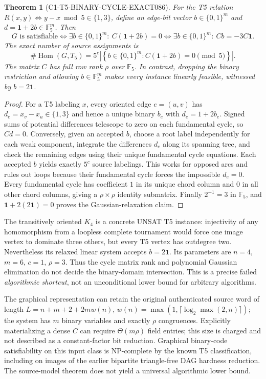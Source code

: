 \documentclass[11pt]{article}
\newtheorem{theorem}{Theorem}
\begin{document}
\begin{theorem}[C1-T5-BINARY-CYCLE-EXACT086]
For the T5 relation $R(x,y)\iff y-x\bmod5\in\{1,3\}$,
define an edge-bit vector $b\in\{0,1\}^m$ and
$d=\mathbf1+2b\in\mathbb F_5^m$. Then
\[
G\text{ is satisfiable}\iff
\exists b\in\{0,1\}^m:\ C(\mathbf1+2b)=0
\iff \exists b\in\{0,1\}^m:\ Cb=-3C\mathbf1.
\]
The exact number of source assignments is
\[
 \#\operatorname{Hom}(G,T_5)
 =
 5^c\left|\left\{b\in\{0,1\}^m:
 C(\mathbf1+2b)=0\pmod5\right\}\right|.
\]
The matrix $C$ has full row rank $\rho$ over $\mathbb F_5$.
In contrast, dropping the binary restriction and allowing
$b\in\mathbb F_5^m$ makes \emph{every instance}
linearly feasible, witnessed by $b=2\mathbf1$.
\end{theorem}
\begin{proof}
For a T5 labeling $x$, every oriented edge $e=(u,v)$ has
$d_e=x_v-x_u\in\{1,3\}$ and hence a unique binary
$b_e$ with $d_e=1+2b_e$. Signed sums of potential differences
telescope to zero on each fundamental cycle, so $Cd=0$.
Conversely, given an accepted $b$, choose a root label independently
for each weak component, integrate the differences $d_e$ along
its spanning tree, and check the remaining edges using their unique
fundamental cycle equations. Each accepted $b$ yields exactly $5^c$
source labelings. This works for opposed arcs and rules out loops
because their fundamental cycle forces the impossible $d_e=0$.
Every fundamental cycle has coefficient $1$ in its unique chord
column and $0$ in all other chord columns, giving a $\rho\times\rho$
identity submatrix. Finally $2^{-1}=3$ in $\mathbb F_5$, and
$\mathbf1+2(2\mathbf1)=0$ proves the Gaussian-relaxation claim.
\end{proof}

The transitively oriented $K_4$ is a concrete UNSAT T5 instance:
injectivity of any homomorphism from a loopless complete tournament
would force one image vertex to dominate three others, but every T5
vertex has outdegree two. Nevertheless its relaxed linear system
accepts $b=2\mathbf1$.  Its parameters are $n=4$, $m=6$,
$c=1$, $\rho=3$. Thus the cycle matrix rank and polynomial Gaussian
elimination do not decide the binary-domain intersection.
This is a precise failed \emph{algorithmic shortcut}, not an
unconditional lower bound for arbitrary algorithms.

The graphical representation can retain the original authenticated
source word of length $L=n+m+2+2mw(n)$,
$w(n)=\max(1,\lceil\log_2\max(2,n)\rceil)$; the system has
$m$ binary variables and exactly $\rho$ congruences. Explicitly
materializing a dense $C$ can require $\Theta(m\rho)$ field entries;
this size is charged and not described as a constant-factor
bit reduction. Graphical binary-code satisfiability on this
input class is NP-complete by the known T5 classification,
including on images of the earlier bipartite triangle-free DAG
hardness reduction. The source-model theorem does not yield
a universal algorithmic lower bound.
\end{document}
